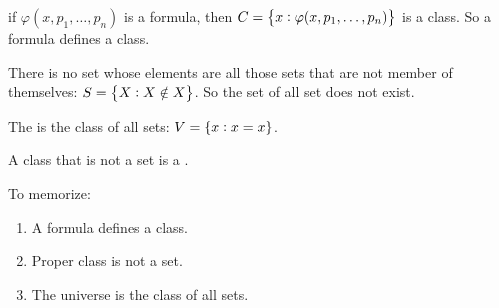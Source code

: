 \begin{definition}
    if $\varphi(x, p_1, \dots, p_n)$ is a formula, then $C = \set{x: \varphi(x, p_1, \dots, p_n)}$ is a class. So a formula defines a class.
\end{definition}

\begin{theorem}
    There is no set whose elements are all those sets that are not member of themselves: $S = \set{X : X \notin X}$. So the set of all set does not exist.
\end{theorem}


\begin{definition}[universe]
    The  is the class of all sets: $V = \set{x: x = x}$.
\end{definition}

\begin{definition}
    A class that is not a set is a .
\end{definition}


To memorize:
\begin{enumerate}
    \item A formula defines a class.
    \item Proper class is not a set.
    \item The universe is the class of all sets.
\end{enumerate}






